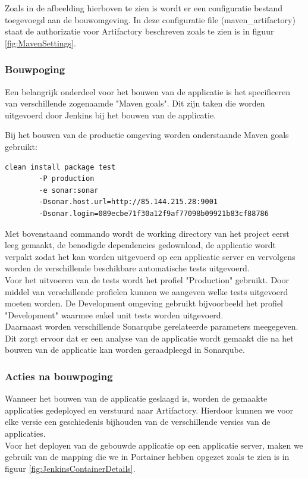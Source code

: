Zoals in de afbeelding hierboven te zien is wordt er een configuratie bestand toegevoegd aan de bouwomgeving. In deze configuratie file (maven\_artifactory) staat de authorizatie voor Artifactory beschreven zoals te zien is in figuur \ref{fig:MavenSettings}.

\newpage
\subsubsection{Bouwpoging}
Een belangrijk onderdeel voor het bouwen van de applicatie is het specificeren van verschillende zogenaamde "Maven goals". Dit zijn taken die worden uitgevoerd door Jenkins bij het bouwen van de applicatie.

Bij het bouwen van de productie omgeving worden onderstaande Maven goals gebruikt: 
\begin{lstlisting}
clean install package test 
		-P production
		-e sonar:sonar 
		-Dsonar.host.url=http://85.144.215.28:9001 
		-Dsonar.login=089ecbe71f30a12f9af77098b09921b83cf88786
\end{lstlisting}

Met bovenstaand commando wordt de working directory van het project eerst leeg gemaakt, de benodigde dependencies gedownload, de applicatie wordt verpakt zodat het kan worden uitgevoerd op een applicatie server en vervolgens worden de verschillende beschikbare automatische tests uitgevoerd.
\\
Voor het uitvoeren van de tests wordt het profiel "Production" gebruikt. Door middel van verschillende profielen kunnen we aangeven welke tests uitgevoerd moeten worden. De Development omgeving gebruikt bijvoorbeeld het profiel "Development" waarmee enkel unit tests worden uitgevoerd.
\\
Daarnaast worden verschillende Sonarqube gerelateerde parameters meegegeven. Dit zorgt ervoor dat er een analyse van de applicatie wordt gemaakt die na het bouwen van de applicatie kan worden geraadpleegd in Sonarqube.
\newpage
\subsubsection{Acties na bouwpoging}
Wanneer het bouwen van de applicatie geslaagd is, worden de gemaakte applicaties gedeployed en verstuurd naar Artifactory. Hierdoor kunnen we voor elke versie een geschiedenis bijhouden van de verschillende versies van de applicaties.
\\
Voor het deployen van de gebouwde applicatie op een applicatie server, maken we gebruik van de mapping die we in Portainer hebben opgezet zoals te zien is in figuur \ref{fig:JenkinsContainerDetails}.

